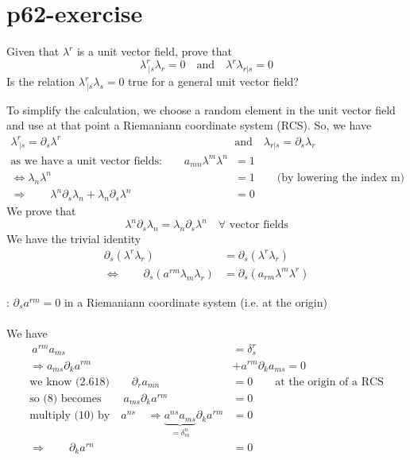 \section{p62-exercise}
\begin{tcolorbox}
Given that $\lambda^r$ is a unit vector field, prove that $$\lambda^r_{\ |s}\lambda_r = 0 \quad \text{and}\quad \lambda^r\lambda_{r|s} = 0 $$
Is the relation $\lambda^r_{\ |s}\lambda_s = 0$ true for a general unit vector field?
\end{tcolorbox}
To simplify the calculation, we choose a random element in the unit vector field and use at that point a Riemaniann coordinate system (RCS). So, we have
\begin{align}
\lambda^r_{\ |s} = \partial_s \lambda^r \quad & \text{and}\quad \lambda_{r|s} = \partial_s \lambda_r\\
\text{as we have a unit vector fields:}\quad\quad a_{mn}\lambda^m\lambda^n &= 1\\
\Leftrightarrow \lambda_n\lambda^n &= 1\quad\quad\text{(by lowering the index m)}\\
\Rightarrow \quad\quad \lambda^n\partial_s \lambda_n + \lambda_n\partial_s \lambda^n &= 0
\end{align}
We prove that $$\lambda^n\partial_s\lambda_n = \lambda_n\partial_s\lambda^n\quad \forall\text{ vector fields}$$
We have the trivial identity
\begin{align}
\partial_s(\lambda^r\lambda_r) &= \partial_s(\lambda^r\lambda_r)\\
\Leftrightarrow \quad\quad \partial_s(a^{rm}\lambda_m\lambda_r) &= \partial_s(a_{rm}\lambda^m\lambda^r)
\end{align}
\begin{lemma}: $\partial_sa^{rm} = 0$ in a Riemaniann coordinate system (i.e. at the origin)\\\\
We have
\begin{align}
\ a^{rm}a_{ms} &= \delta^r_s\\
\Rightarrow a_{ms}\partial_k a^{rm}  & +a^{rm}\partial_k a_{ms} = 0\\
\text{we know (2.618)}\quad\quad \partial_r a_{mn} &= 0\quad\quad\text{at the origin of a RCS}\\
\text{so (8) becomes}\quad\quad a_{ms}\partial_k a^{rm} & = 0\\
\text{multiply (10) by}\quad a^{ns}\quad\Rightarrow \underbrace{a^{ns}a_{ms}}_{= \delta^n_m}\partial_k a^{rm}& = 0\\
\Rightarrow\quad\quad \partial_k a^{rn}& = 0
\end{align}
\end{lemma}
